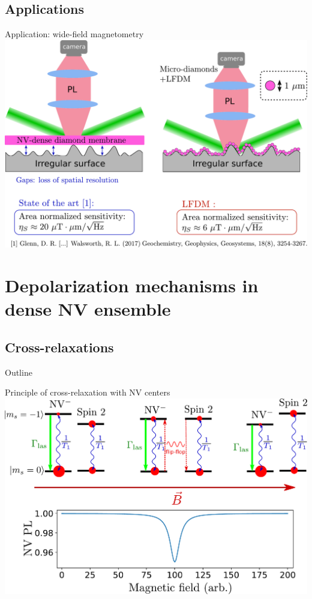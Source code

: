 \documentclass{beamer}
\begin{document}
\subsection{Applications}
\begin{frame}{Application: wide-field magnetometry}
\centering
\includegraphics[width=\textwidth,height=0.85\textheight,keepaspectratio]{Slide_applications_wide_field_f}
\end{frame}

\section{Depolarization mechanisms in dense NV ensemble}
\subsection{Cross-relaxations}
\begin{frame}{Outline}
\tableofcontents[currentsection]
\end{frame}
\begin{frame}{Principle of cross-relaxation with NV centers}
\centering
\includegraphics[width=\textwidth,height=0.8\textheight,keepaspectratio]{Slide_CR_presentation}
\end{frame}
\end{document}
